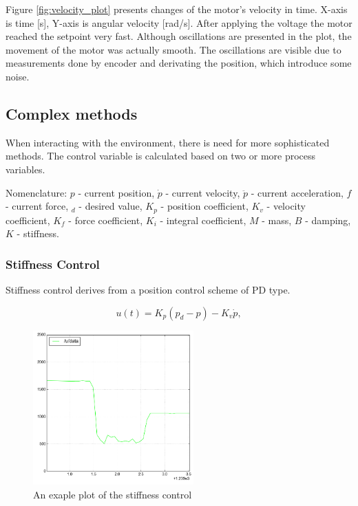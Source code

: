 Figure \ref{fig:velocity_plot} presents changes of the motor's velocity in time. X-axis is time [s], Y-axis is angular velocity [rad/s]. After applying the voltage the motor reached the setpoint very fast. Although oscillations are presented in the plot, the movement of the motor was actually smooth. The oscillations are visible due to measurements done by encoder and derivating the position, which introduce some noise.

\subsection{Complex methods}
When interacting with the environment, there is need for more sophisticated methods. The control variable is calculated based on two or more process variables.

Nomenclature: $p$ - current position, $\dot{p}$ - current velocity, $\ddot{p}$ - current acceleration, $f$ - current force, $_d$ - desired value, $K_p$ - position coefficient, $K_v$ - velocity coefficient, $K_f$ - force coefficient, $K_i$ - integral coefficient, $M$ - mass, $B$ - damping, $K$ - stiffness.

\subsubsection{Stiffness Control}
Stiffness control derives from a position control scheme of PD type.

\begin{equation}
u(t) = K_{p}(p_{d} - p) - K_{v} \dot{p},
\end{equation}

\begin{figure}%
 \begin{center} 
  \includegraphics[width=0.55\textwidth]{./stuff/stiffness_plot}
 \end{center}
 \caption{An exaple plot of the stiffness control}
 \label{fig:stiffness_plot} 
\end{figure} 

